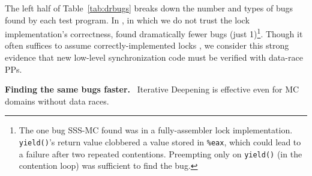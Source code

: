 The left half of Table~\ref{tab:drbugs}
breaks down the number and types of bugs found by each test program.
In \mxtest, in which we do not trust the lock implementation's correctness,
found dramatically fewer bugs (just 1)\footnote{
	The one bug SSS-MC found was in a fully-assembler lock implementation. {\tt yield()}'s return value clobbered a value stored in {\tt \%eax}, which could lead to a failure after two repeated contentions. Preempting only on {\tt yield()} (in the contention loop) was sufficient to find the bug.}.
Though it often suffices to assume correctly-implemented locks \cite{dbug-thesis},
we consider this strong evidence that new low-level synchronization code must be verified with data-race PPs.


{\bf Finding the same bugs faster.}
~Iterative Deepening is effective even for MC domains without data races.

